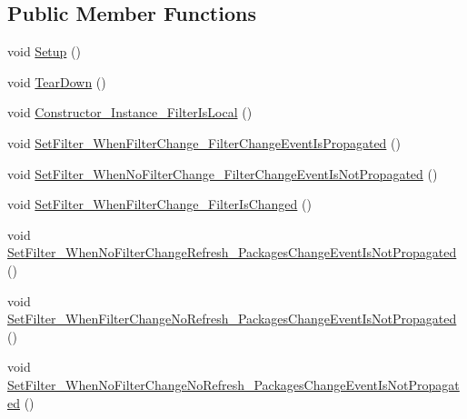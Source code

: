 \subsection*{Public Member Functions}
\begin{DoxyCompactItemize}
\item 
void \mbox{\hyperlink{class_unity_editor_1_1_package_manager_1_1_u_i_1_1_tests_1_1_package_collection_tests_a452dcbec81fffb1527a8c3e053e1ba03}{Setup}} ()
\item 
void \mbox{\hyperlink{class_unity_editor_1_1_package_manager_1_1_u_i_1_1_tests_1_1_package_collection_tests_ab5dbc257b2e6d836808cb0e659f0f96a}{Tear\+Down}} ()
\item 
void \mbox{\hyperlink{class_unity_editor_1_1_package_manager_1_1_u_i_1_1_tests_1_1_package_collection_tests_ae499cfbdbc1bc06ce717df7db3800bad}{Constructor\+\_\+\+Instance\+\_\+\+Filter\+Is\+Local}} ()
\item 
void \mbox{\hyperlink{class_unity_editor_1_1_package_manager_1_1_u_i_1_1_tests_1_1_package_collection_tests_ad5c8cea417bd2374a2d113d3c7210d40}{Set\+Filter\+\_\+\+When\+Filter\+Change\+\_\+\+Filter\+Change\+Event\+Is\+Propagated}} ()
\item 
void \mbox{\hyperlink{class_unity_editor_1_1_package_manager_1_1_u_i_1_1_tests_1_1_package_collection_tests_a74d43688a3faa108b761695644f2826f}{Set\+Filter\+\_\+\+When\+No\+Filter\+Change\+\_\+\+Filter\+Change\+Event\+Is\+Not\+Propagated}} ()
\item 
void \mbox{\hyperlink{class_unity_editor_1_1_package_manager_1_1_u_i_1_1_tests_1_1_package_collection_tests_aa13b71f42838afcce7a66715458bba4a}{Set\+Filter\+\_\+\+When\+Filter\+Change\+\_\+\+Filter\+Is\+Changed}} ()
\item 
void \mbox{\hyperlink{class_unity_editor_1_1_package_manager_1_1_u_i_1_1_tests_1_1_package_collection_tests_ad39ad9978d0b2f64cb7860fdfdb42c36}{Set\+Filter\+\_\+\+When\+No\+Filter\+Change\+Refresh\+\_\+\+Packages\+Change\+Event\+Is\+Not\+Propagated}} ()
\item 
void \mbox{\hyperlink{class_unity_editor_1_1_package_manager_1_1_u_i_1_1_tests_1_1_package_collection_tests_a8d0665d38abfb96bb3729ee08a95539e}{Set\+Filter\+\_\+\+When\+Filter\+Change\+No\+Refresh\+\_\+\+Packages\+Change\+Event\+Is\+Not\+Propagated}} ()
\item 
void \mbox{\hyperlink{class_unity_editor_1_1_package_manager_1_1_u_i_1_1_tests_1_1_package_collection_tests_a190bc5b3b24f4d3c72115a25e76376a3}{Set\+Filter\+\_\+\+When\+No\+Filter\+Change\+No\+Refresh\+\_\+\+Packages\+Change\+Event\+Is\+Not\+Propagated}} ()

\end{DoxyCompactItemize}
